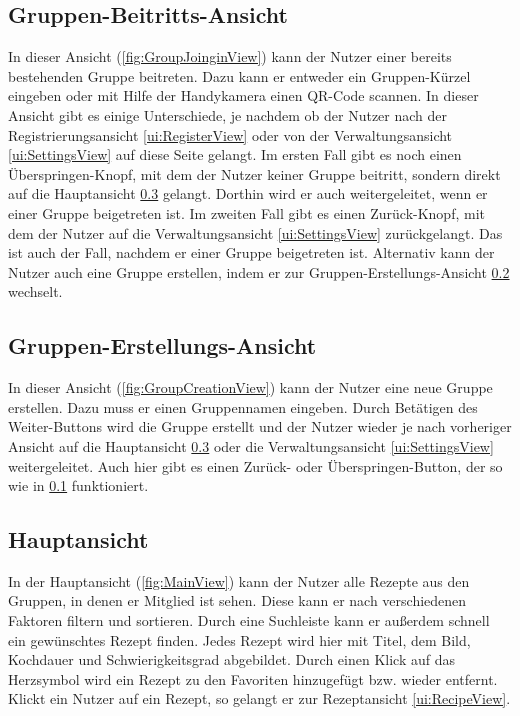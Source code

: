 \documentclass[parskip=full]{scrartcl}
\begin{document}
\subsection{Gruppen-Beitritts-Ansicht}

\label{ui:GroupJoiningView}
In dieser Ansicht (\autoref{fig:GroupJoinginView}) kann der Nutzer einer bereits bestehenden Gruppe beitreten. Dazu kann er entweder ein Gruppen-Kürzel eingeben oder mit Hilfe der Handykamera einen QR-Code scannen. In dieser Ansicht gibt es einige Unterschiede, je nachdem ob der Nutzer nach der Registrierungsansicht \ref{ui:RegisterView} oder von der Verwaltungsansicht \ref{ui:SettingsView} auf diese Seite gelangt. Im ersten Fall gibt es noch einen Überspringen-Knopf, mit dem der Nutzer keiner Gruppe beitritt, sondern direkt auf die Hauptansicht \ref{ui:MainView} gelangt. Dorthin wird er auch weitergeleitet, wenn er einer Gruppe beigetreten ist. Im zweiten Fall gibt es einen Zurück-Knopf, mit dem der Nutzer auf die Verwaltungsansicht \ref{ui:SettingsView} zurückgelangt. Das ist auch der Fall, nachdem er einer Gruppe beigetreten ist.
Alternativ kann der Nutzer auch eine Gruppe erstellen, indem er zur Gruppen-Erstellungs-Ansicht \ref{ui:GroupCreationView} wechselt.

\subsection{Gruppen-Erstellungs-Ansicht}
\label{ui:GroupCreationView}
In dieser Ansicht (\autoref{fig:GroupCreationView}) kann der Nutzer eine neue Gruppe erstellen. Dazu muss er einen Gruppennamen eingeben. Durch Betätigen des Weiter-Buttons wird die Gruppe erstellt und der Nutzer wieder je nach vorheriger Ansicht auf die Hauptansicht \ref{ui:MainView} oder die Verwaltungsansicht \ref{ui:SettingsView} weitergeleitet. Auch hier gibt es einen Zurück- oder Überspringen-Button, der so wie in \ref{ui:GroupJoiningView} funktioniert.

\subsection{Hauptansicht}
\label{ui:MainView}
In der Hauptansicht (\autoref{fig:MainView}) kann der Nutzer alle Rezepte aus den Gruppen, in denen er Mitglied ist sehen. Diese kann er nach verschiedenen Faktoren filtern und sortieren. Durch eine Suchleiste kann er außerdem schnell ein gewünschtes Rezept finden. Jedes Rezept wird hier mit Titel, dem Bild, Kochdauer und Schwierigkeitsgrad abgebildet. Durch einen Klick auf das Herzsymbol wird ein Rezept zu den Favoriten hinzugefügt bzw. wieder entfernt. Klickt ein Nutzer auf ein Rezept, so gelangt er zur Rezeptansicht \ref{ui:RecipeView}.
\end{document}
